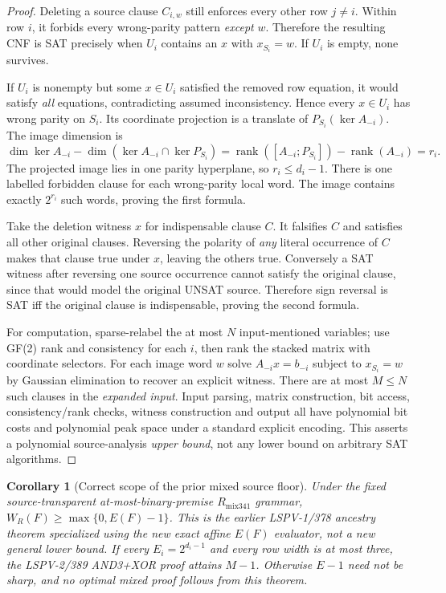 \documentclass[11pt]{article}
\newtheorem{corollary}{Corollary}
\begin{document}
\begin{proof}
Deleting a source clause $C_{i,w}$ still enforces every other row $j\ne i$. Within row $i$, it forbids every wrong-parity pattern \emph{except} $w$. Therefore the resulting CNF is SAT precisely when $U_i$ contains an $x$ with $x_{S_i}=w$. If $U_i$ is empty, none survives.

If $U_i$ is nonempty but some $x\in U_i$ satisfied the removed row equation, it would satisfy \emph{all} equations, contradicting assumed inconsistency. Hence every $x\in U_i$ has wrong parity on $S_i$. Its coordinate projection is a translate of $P_{S_i}(\ker A_{-i})$. The image dimension is
\[
\dim \ker A_{-i}-\dim(\ker A_{-i}\cap\ker P_{S_i})
=\operatorname{rank}([A_{-i};P_{S_i}])-\operatorname{rank}(A_{-i})=r_i.
\]
The projected image lies in one parity hyperplane, so $r_i\le d_i-1$. There is one labelled forbidden clause for each wrong-parity local word. The image contains exactly $2^{r_i}$ such words, proving the first formula.

Take the deletion witness $x$ for indispensable clause $C$. It falsifies $C$ and satisfies all other original clauses. Reversing the polarity of \emph{any} literal occurrence of $C$ makes that clause true under $x$, leaving the others true. Conversely a SAT witness after reversing one source occurrence cannot satisfy the original clause, since that would model the original UNSAT source. Therefore sign reversal is SAT iff the original clause is indispensable, proving the second formula.

For computation, sparse-relabel the at most $N$ input-mentioned variables; use GF(2) rank and consistency for each $i$, then rank the stacked matrix with coordinate selectors. For each image word $w$ solve $A_{-i}x=b_{-i}$ subject to $x_{S_i}=w$ by Gaussian elimination to recover an explicit witness. There are at most $M\le N$ such clauses in the \emph{expanded input}. Input parsing, matrix construction, bit access, consistency/rank checks, witness construction and output all have polynomial bit costs and polynomial peak space under a standard explicit encoding. This asserts a polynomial source-analysis \emph{upper bound}, not any lower bound on arbitrary SAT algorithms.
\end{proof}

\begin{corollary}[Correct scope of the prior mixed source floor]
Under the fixed source-transparent at-most-binary-premise $R_{\mathrm{mix341}}$ grammar, $W_R(F)\ge\max\{0,E(F)-1\}$. This is the earlier LSPV-1/378 ancestry theorem specialized using the \emph{new} exact affine $E(F)$ evaluator, not a new general lower bound. If every $E_i=2^{d_i-1}$ and every row width is at most three, the LSPV-2/389 AND3+XOR proof attains $M-1$. Otherwise $E-1$ need not be sharp, and no optimal mixed proof follows from this theorem.
\end{corollary}
\end{document}
